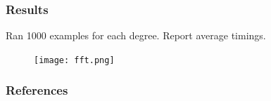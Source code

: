\documentclass{beamer}
\begin{document}
\begin{frame}
    \frametitle{Results}
    
    Ran 1000 examples for each degree. Report average timings.

    \begin{figure}
        \texttt{[image: fft.png]}
    \end{figure}
\end{frame}

\begin{frame}
    \frametitle{References}

    
    
\end{frame}
\end{document}
